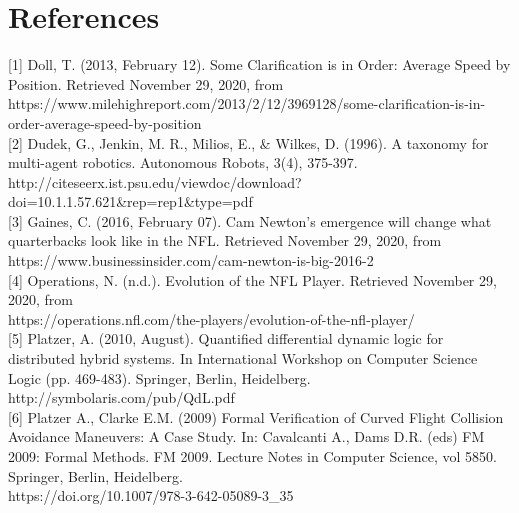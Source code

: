 \newpage %

%

\section{References}





[1] Doll, T. (2013, February 12). Some Clarification is in Order: Average Speed by Position. Retrieved November 29, 2020, from \\ https://www.milehighreport.com/2013/2/12/3969128/some-clarification-is-in-order-average-speed-by-position \\
 
[2] Dudek, G., Jenkin, M. R., Milios, E., \& Wilkes, D. (1996). A taxonomy for multi-agent robotics. Autonomous Robots, 3(4), 375-397. \\
http://citeseerx.ist.psu.edu/viewdoc/download?doi=10.1.1.57.621\&rep=rep1\&type=pdf \\
 
[3] Gaines, C. (2016, February 07). Cam Newton's emergence will change what quarterbacks look like in the NFL. Retrieved November 29, 2020, from \\ https://www.businessinsider.com/cam-newton-is-big-2016-2 \\
 
[4] Operations, N. (n.d.). Evolution of the NFL Player. Retrieved November 29, 2020, from \\ https://operations.nfl.com/the-players/evolution-of-the-nfl-player/ \\
 
[5] Platzer, A. (2010, August). Quantified differential dynamic logic for distributed hybrid systems. In International Workshop on Computer Science Logic (pp. 469-483). Springer, Berlin, Heidelberg.
\\ http://symbolaris.com/pub/QdL.pdf  \\
 
[6] Platzer A., Clarke E.M. (2009) Formal Verification of Curved Flight Collision Avoidance Maneuvers: A Case Study. In: Cavalcanti A., Dams D.R. (eds) FM 2009: Formal Methods. FM 2009. Lecture Notes in Computer Science, vol 5850. Springer, Berlin, Heidelberg. \\ https://doi.org/10.1007/978-3-642-05089-3\_35 \\
